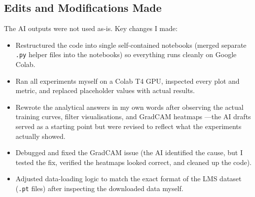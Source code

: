\documentclass[11pt,a4paper]{article}
\begin{document}
\subsection*{Edits and Modifications Made}

The AI outputs were not used as-is. Key changes I made:
\begin{itemize}
  \item Restructured the code into single self-contained notebooks (merged
        separate \texttt{.py} helper files into the notebooks) so everything
        runs cleanly on Google Colab.
  \item Ran all experiments myself on a Colab T4 GPU, inspected every plot and
        metric, and replaced placeholder values with actual results.
  \item Rewrote the analytical answers in my own words after observing the
        actual training curves, filter visualisations, and GradCAM heatmaps
        ---the AI drafts served as a starting point but were revised to
        reflect what the experiments actually showed.
  \item Debugged and fixed the GradCAM issue (the AI identified the cause, but
        I tested the fix, verified the heatmaps looked correct, and cleaned up
        the code).
  \item Adjusted data-loading logic to match the exact format of the LMS
        dataset (\texttt{.pt} files) after inspecting the downloaded data
        myself.
\end{itemize}
\end{document}
